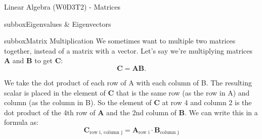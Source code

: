 \begin{textbox}{Linear Algebra (W0D3T2) - Matrices}
\begin{subbox}{subbox}{Eigenvalues \& Eigenvectors}
\end{subbox}

\begin{subbox}{subbox}{Matrix Multiplication}
\tiny
We sometimes want to multiple two matrices together, instead of a matrix with a vector. Let's say we're multiplying matrices $\mathbf{A}$ and $\mathbf{B}$ to get $\mathbf{C}$:
\begin{equation}
\mathbf{C} = \mathbf{A}\mathbf{B}\text{.}
\end{equation}

We take the dot product of each row of A with each column of B. The resulting scalar is placed in the element of $\mathbf{C}$ that is the same row (as the row in A) and column (as the column in B). So the element of $\mathbf{C}$ at row 4 and column 2 is the dot product of the 4th row of $\mathbf{A}$ and the 2nd column of $\mathbf{B}$. We can write this in a formula as:
\begin{equation}\mathbf{C}_{\text{row i, column j}} = \mathbf{A}_{\text{row i}} \cdot \mathbf{B}_{\text{column j}}
\end{equation}
\end{subbox}
\end{textbox}

